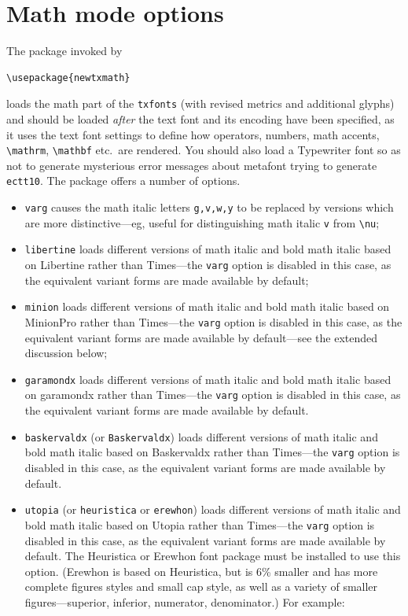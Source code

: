 \documentclass[11pt]{article}
\theoremstyle{oldplain}
\theoremstyle{plain}
\begin{document}
\section{Math mode options}
The package invoked by
\begin{verbatim}
\usepackage{newtxmath}
\end{verbatim}
loads the math part of the {\tt txfonts} (with revised metrics and additional glyphs) and should be loaded \emph{after} the text font and its encoding have been specified, as it uses the text font settings to define how operators, numbers, math accents, \verb|\mathrm|, \verb|\mathbf| etc.\ are rendered. You should also load a Typewriter font so as not to generate mysterious error messages about \textsf{metafont} trying to generate \texttt{ectt10}. The package offers a number of options.
\begin{itemize}
\item {\tt varg} causes the math italic letters \verb|g,v,w,y| to be replaced by versions which are more distinctive---eg, useful for distinguishing math italic \verb|v| from \verb|\nu|;
\item {\tt libertine} loads different versions of math italic and bold math italic based on \textsf{Libertine} rather than \textsf{Times}---the {\tt varg} option is disabled in this case, as the equivalent variant forms are made available by default;
\item {\tt minion} loads different versions of math italic and bold math italic based on \textsf{MinionPro} rather than \textsf{Times}---the {\tt varg} option is disabled in this case, as the equivalent variant forms are made available by default---see the extended discussion below;
\item {\tt garamondx} loads different versions of math italic and bold math italic based on \textsf{garamondx} rather than \textsf{Times}---the {\tt varg} option is disabled in this case, as the equivalent variant forms are made available by default.
\item {\tt baskervaldx} (or {\tt Baskervaldx}) loads different versions of math italic and bold math italic based on \textsf{Baskervaldx} rather than \textsf{Times}---the {\tt varg} option is disabled in this case, as the equivalent variant forms are made available by default.
\item {\tt utopia} (or {\tt heuristica} or {\tt erewhon}) loads different versions of math italic and bold math italic based on \textsf{Utopia} rather than \textsf{Times}---the {\tt varg} option is disabled in this case, as the equivalent variant forms are made available by default. The Heuristica or Erewhon font package must be installed to use this option. (Erewhon is based on Heuristica, but is 6\% smaller and has more complete figures styles and small cap style, as well as a variety of smaller figures---superior, inferior, numerator, denominator.)  For example:

\end{itemize}
\end{document}
